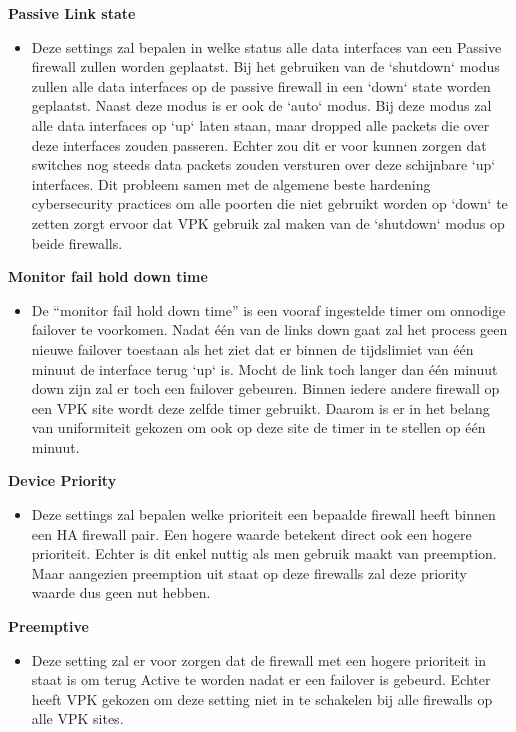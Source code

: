 \textbf{Passive Link state}
    \begin{itemize}[label=\textbullet]
        \item Deze settings zal bepalen in welke status alle data interfaces van een Passive firewall zullen worden geplaatst. Bij het gebruiken van de `shutdown` modus zullen alle data interfaces op de passive firewall in een `down` state worden geplaatst. Naast deze modus is er ook de `auto` modus. Bij deze modus zal alle data interfaces op `up` laten staan, maar dropped alle packets die over deze interfaces zouden passeren. Echter zou dit er voor kunnen zorgen dat switches nog steeds data packets zouden versturen over deze schijnbare `up` interfaces. Dit probleem samen met de algemene beste hardening cybersecurity practices om alle poorten die niet gebruikt worden op `down` te zetten zorgt ervoor dat VPK gebruik zal maken van de `shutdown` modus op beide firewalls.
    \end{itemize}



\textbf{Monitor fail hold down time}
    \begin{itemize}[label=\textbullet]
        \item De ``monitor fail hold down time'' is een vooraf ingestelde timer om onnodige failover te voorkomen. Nadat één van de links down gaat zal het process geen nieuwe failover toestaan als het ziet dat er binnen de tijdslimiet van één minuut de interface terug `up` is. Mocht de link toch langer dan één minuut down zijn zal er toch een failover gebeuren. Binnen iedere andere firewall op een VPK site wordt deze zelfde timer gebruikt. Daarom is er in het belang van uniformiteit gekozen om ook op deze site de timer in te stellen op één minuut.
    \end{itemize}



\textbf{Device Priority}
    \begin{itemize}[label=\textbullet]
        \item Deze settings zal bepalen welke prioriteit een bepaalde firewall heeft binnen een HA firewall pair. Een hogere waarde betekent direct ook een hogere prioriteit. Echter is dit enkel nuttig als men gebruik maakt van preemption. Maar aangezien preemption uit staat op deze firewalls zal deze priority waarde dus geen nut hebben.
    \end{itemize}



\textbf{Preemptive}
    \begin{itemize}[label=\textbullet]
        \item Deze setting zal er voor zorgen dat de firewall met een hogere prioriteit in staat is om terug Active te worden nadat er een failover is gebeurd. Echter heeft VPK gekozen om deze setting niet in te schakelen bij alle firewalls op alle VPK sites.
    \end{itemize}



